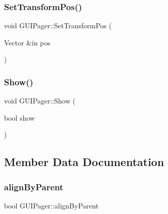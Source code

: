 \hypertarget{class_g_u_i_pager_af311b1267e6bd06ea10287824c063c3e}{}\label{class_g_u_i_pager_af311b1267e6bd06ea10287824c063c3e} 
\subsubsection{\texorpdfstring{Set\+Transform\+Pos()}{SetTransformPos()}}
{\footnotesize\ttfamily void G\+U\+I\+Pager\+::\+Set\+Transform\+Pos (\begin{DoxyParamCaption}\item[{Vector \&in}]{pos }\end{DoxyParamCaption})}

\hypertarget{class_g_u_i_pager_a324c3a460899427e871eeb1fdcaf3fae}{}\label{class_g_u_i_pager_a324c3a460899427e871eeb1fdcaf3fae} 
\subsubsection{\texorpdfstring{Show()}{Show()}}
{\footnotesize\ttfamily void G\+U\+I\+Pager\+::\+Show (\begin{DoxyParamCaption}\item[{bool}]{show }\end{DoxyParamCaption})}



\subsection{Member Data Documentation}
\hypertarget{class_g_u_i_pager_a96d4f7efa482a81bd3561a69b68636a7}{}\label{class_g_u_i_pager_a96d4f7efa482a81bd3561a69b68636a7} 
\subsubsection{\texorpdfstring{align\+By\+Parent}{alignByParent}}
{\footnotesize\ttfamily bool G\+U\+I\+Pager\+::align\+By\+Parent}

\hypertarget{class_g_u_i_pager_a87e6855bf35c7112c0ac88c0afa4bd86}{}\label{class_g_u_i_pager_a87e6855bf35c7112c0ac88c0afa4bd86} 
